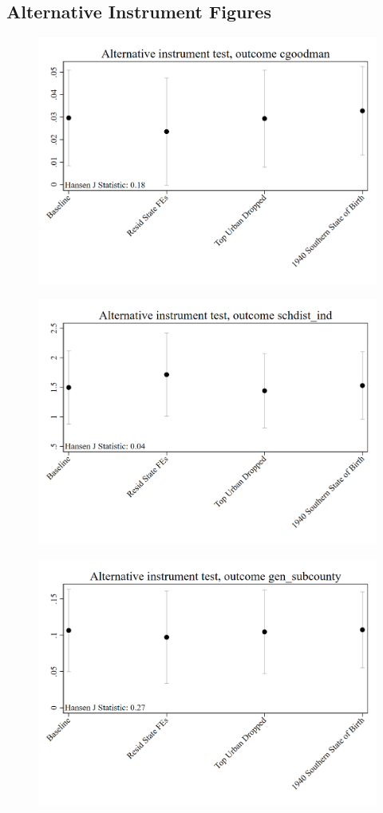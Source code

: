 \documentclass{article}
\begin{document}
\subsection{Alternative Instrument Figures}
\clearpage
\begin{figure}
	\centering
	\includegraphics[width=.8\textwidth]{figures/exogeneity_tests/D16_alt_inst_pooled_cgoodman_urban.png}
\end{figure}
\clearpage
\begin{figure}
	\centering
	\includegraphics[width=.8\textwidth]{figures/exogeneity_tests/D16_alt_inst_pooled_schdist_ind_urban.png}
\end{figure}
\clearpage
\begin{figure}
	\centering
	\includegraphics[width=.8\textwidth]{figures/exogeneity_tests/D16_alt_inst_pooled_gen_subcounty_urban.png}
\end{figure}
\end{document}
